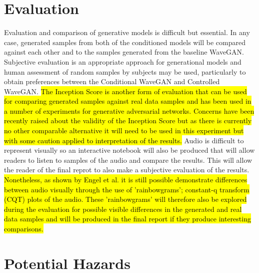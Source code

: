 \documentclass[titlepage]{article}
\begin{document}
\section{Evaluation}

Evaluation and comparison of generative models is difficult but essential.
In any case, generated samples from both of the conditioned models will be compared against each other and to the samples generated from the baseline WaveGAN.
\newline
\newline
Subjective evaluation is an appropriate approach for generational models and human assessment of random samples by subjects may be used, particularly to obtain preferences between the Conditional WaveGAN and Controlled WaveGAN.
\newline
\newline
{}
\hl{
  The Inception Score is another form of evaluation that can be used for comparing generated samples against real data samples and has been used in a number of experiments for generative adversarial networks.
  Concerns have been recently raised about the validity of the Inception Score but as there is currently no other comparable alternative it will need to be used in this experiment but with some caution applied to interpretation of the results.
}
\newline
\newline
Audio is difficult to represent visually so an interactive notebook will also be produced that will allow readers to listen to samples of the audio and compare the results.
This will allow the reader of the final reprot to also make a subjective evaluation of the results.
\hl{
  Nonetheless, as shown by Engel et al. it is still possible demonstrate differences between audio visually through the use of 'rainbowgrams'; constant-q transform (CQT) plots of the audio.
  These 'rainbowgrams' will therefore also be explored during the evaluation for possible visible differences in the generated and real data samples and will be produced in the final report if they produce interesting comparisons.
}

\section{Potential Hazards}
\end{document}
